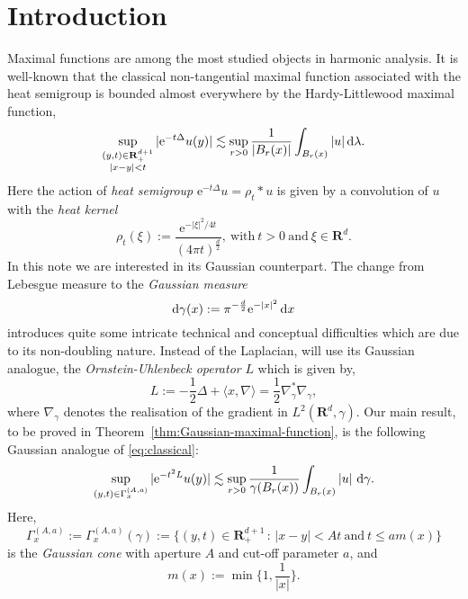 \documentclass{amsart}
\theoremstyle{remark}
\newcommand{\D}{\,\textup{d}}
\newcommand{\la}{\langle}
\newcommand{\ra}{\rangle}
\newcommand{\LHG}{{L^2(\R^d,\gamma)}}
\renewcommand{\leq}{\leqslant}
\newcommand{\R}{\mathbf R}
\newcommand{\e}{\mathrm{e}} %
\begin{document}
\section{Introduction}
Maximal functions are among the most studied objects in harmonic
analysis. 
It is well-known that the classical non-tangential maximal function associated
with the heat semigroup is bounded almost everywhere by the Hardy-Littlewood
maximal function,
\begin{equation}\label{eq:classical}
  \sup_{\substack{(y, t) \in   \R^{d + 1}_+\\ |x - y| < t}} |\e^{-t \Delta} u(y)| \lesssim \sup_{r
    > 0}  \frac1{|B_r(x)|}\int_{B_r(x)} |u| \D\lambda.
\end{equation}
Here the action of \emph{heat semigroup} $\e^{-t \Delta} u = \rho_t \ast u$ is
given by a convolution of $u$ with the \emph{heat kernel}
\begin{equation*}
  \rho_t(\xi) := \frac{\e^{-|\xi|^2/4t}}{(4\pi t)^{\frac{d}2}}, \:\text{with}\:
  t > 0 \:\text{and}\: \xi \in \R^d.
\end{equation*}
In this note we are interested in its Gaussian counterpart. The change from
Lebesgue measure to the \textit{Gaussian measure}
\begin{equation}
  \label{eq:Gaussian-measure}
  \mathrm{d}\gamma(x) := \pi^{-\frac{d}2} \e^{-|x|^2} \D{x}
\end{equation}
introduces quite some intricate technical and conceptual difficulties which are
due to its non-doubling nature. Instead of the Laplacian, will use its Gaussian
analogue, the \emph{Ornstein-Uhlenbeck operator} $L$ which is given by,
\begin{equation}
  \label{eq:Ornstein-Uhlenbeck-operator}
  L := -\frac12 \Delta + \la x, \nabla \ra = \frac12 \nabla_\gamma^* \nabla_\gamma,
\end{equation}
where $\nabla_\gamma$ denotes the realisation of the gradient in $\LHG$.
Our main result, to be proved in Theorem~\ref{thm:Gaussian-maximal-function},
is the following Gaussian analogue of \eqref{eq:classical}:
\begin{equation}
  \label{eq:main}
  \sup_{(y, t) \in \Gamma_x^{(A, a)}} |\e^{-t^2 L} u(y)| \lesssim \sup_{r > 0}
  \frac1{\gamma(B_r(x))}\int_{B_r(x)} |u| \, \D\gamma.
\end{equation}
Here, 
\begin{equation}
  \label{eq:Gaussian-cone}
  \Gamma_x^{(A, a)} := \Gamma_x^{(A, a)}(\gamma) := \{(y, t) \in \R^{d + 1}_+
  \,: \, |x - y| < At \:\text{and}\: t \leq a m(x)\}
\end{equation}
is the \textit{Gaussian cone} with aperture $A$ and cut-off parameter $a$, and
\begin{equation}\label{eq:m-function}
  m(x) := \min\biggl\{1, \frac1{|x|} \biggr\}.
\end{equation}
\end{document}
